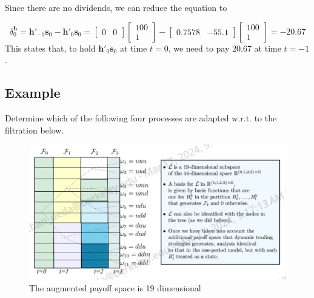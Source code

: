 \documentclass[11pt]{article}
\begin{document}
Since there are no dividends, we can reduce the equation to 

\[
    \delta_0^{\boldsymbol{h}} = \boldsymbol{h}'_{-1}\boldsymbol{s}_0 - \boldsymbol{h}'_{0}
    \boldsymbol{s}_0
    = \begin{bmatrix}
        0 & 0
    \end{bmatrix}
    \begin{bmatrix} 
        100 \\ 
        1 
    \end{bmatrix} -
    \begin{bmatrix}
        0.7578 & -55.1    
    \end{bmatrix}
    \begin{bmatrix} 
        100 \\ 
        1 
    \end{bmatrix} = -20.67
\]
This states that, to hold $\boldsymbol{h}'_{0} \boldsymbol{s}_0$ at time $t=0$, we need to pay 
$20.67$ at time $t=-1$.

\subsection{Example}
Determine which of the following four processes are adapted w.r.t. to the filtration below.

\begin{figure}[H] 
    \centering 
    \includegraphics[width=6in]{imgs/embedding.png}
    \caption{The augmented payoff space is 19 dimensional}
\end{figure}
\end{document}
